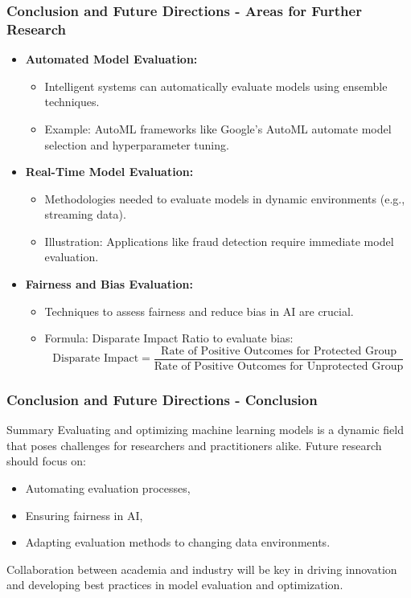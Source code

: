 \documentclass[aspectratio=169]{beamer}
\begin{document}
\begin{frame}[fragile]
    \frametitle{Conclusion and Future Directions - Areas for Further Research}
    \begin{itemize}
        \item \textbf{Automated Model Evaluation:}
        \begin{itemize}
            \item Intelligent systems can automatically evaluate models using ensemble techniques.
            \item Example: AutoML frameworks like Google’s AutoML automate model selection and hyperparameter tuning.
        \end{itemize}
        
        \item \textbf{Real-Time Model Evaluation:}
        \begin{itemize}
            \item Methodologies needed to evaluate models in dynamic environments (e.g., streaming data).
            \item Illustration: Applications like fraud detection require immediate model evaluation.
        \end{itemize}

        \item \textbf{Fairness and Bias Evaluation:}
        \begin{itemize}
            \item Techniques to assess fairness and reduce bias in AI are crucial.
            \item Formula: Disparate Impact Ratio to evaluate bias:
            \begin{equation}
                \text{Disparate Impact} = \frac{\text{Rate of Positive Outcomes for Protected Group}}{\text{Rate of Positive Outcomes for Unprotected Group}}
            \end{equation}
        \end{itemize}
    \end{itemize}
\end{frame}

\begin{frame}[fragile]
    \frametitle{Conclusion and Future Directions - Conclusion}
    \begin{block}{Summary}
        Evaluating and optimizing machine learning models is a dynamic field that poses challenges for researchers and practitioners alike. 
        Future research should focus on:
        \begin{itemize}
            \item Automating evaluation processes,
            \item Ensuring fairness in AI,
            \item Adapting evaluation methods to changing data environments.
        \end{itemize}
        Collaboration between academia and industry will be key in driving innovation and developing best practices in model evaluation and optimization.
    \end{block}
\end{frame}
\end{document}
